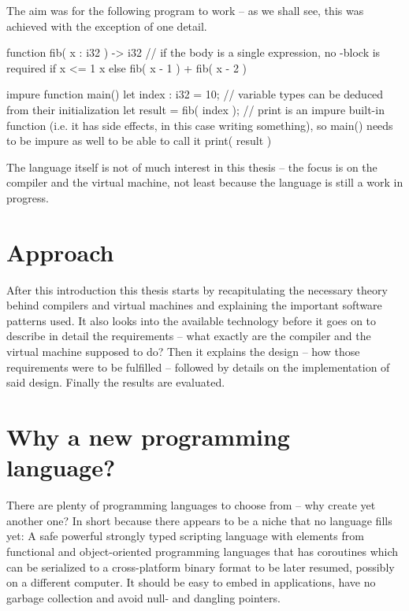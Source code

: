 	The aim was for the following program to work -- as we shall see, this was achieved with the exception of one detail.
	
	\begin{perseuslisting}[caption={Desired target language example},label={lst:target_language}]
function fib( x : i32 ) -> i32
    // if the body is a single expression, no {}-block is required
    if x <= 1
        x
    else
        fib( x - 1 ) + fib( x - 2 )

impure function main()
{
	let index : i32 = 10;
	// variable types can be deduced from their initialization
	let result = fib( index );
	// print is an impure built-in function (i.e. it has side effects, in this case writing something), so main() needs to be impure as well to be able to call it
	print( result )
}
	\end{perseuslisting}
	
	The language itself is not of much interest in this thesis -- the focus is on the compiler and the virtual machine, not least because the language is still a work in progress.
    
    
	\section{Approach} %
	
	After this introduction this thesis starts by recapitulating the necessary theory behind compilers and virtual machines and explaining the important software patterns used. It also looks into the available technology before it goes on to describe in detail the requirements -- what exactly are the compiler and the virtual machine supposed to do? Then it explains the design -- how those requirements were to be fulfilled -- followed by details on the implementation of said design. Finally the results are evaluated.
	
	
	\section{Why a new programming language?}
	
	There are plenty of programming languages to choose from -- why create yet another one? In short because there appears to be a niche that no language fills yet: A safe powerful strongly typed scripting language with elements from functional and object-oriented programming languages that has coroutines which can be serialized to a cross-platform binary format to be later resumed, possibly on a different computer. It should be easy to embed in {\CC} applications, have no garbage collection and avoid null- and dangling pointers.
	
